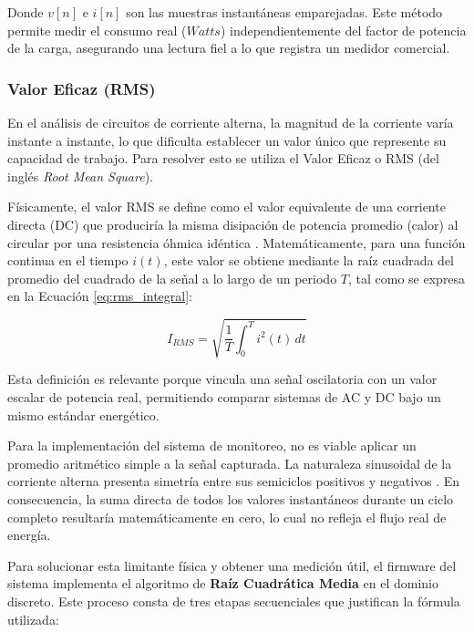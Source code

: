             Donde $v[n]$ e $i[n]$ son las muestras instantáneas emparejadas. Este método permite medir el consumo real ($Watts$) independientemente del factor de potencia de la carga, asegurando una lectura fiel a lo que registra un medidor comercial.

        \subsubsection{Valor Eficaz (RMS)}

            En el análisis de circuitos de corriente alterna, la magnitud de la corriente varía instante a instante, lo que dificulta establecer un valor único que represente su capacidad de trabajo. Para resolver esto se utiliza el Valor Eficaz o RMS (del inglés \textit{Root Mean Square}).

            Físicamente, el valor RMS se define como el valor equivalente de una corriente directa (DC) que produciría la misma disipación de potencia promedio (calor) al circular por una resistencia óhmica idéntica \cite{hayt2012}. Matemáticamente, para una función continua en el tiempo $i(t)$, este valor se obtiene mediante la raíz cuadrada del promedio del cuadrado de la señal a lo largo de un periodo $T$, tal como se expresa en la Ecuación \ref{eq:rms_integral}:

            \begin{equation}
                I_{RMS} = \sqrt{\frac{1}{T} \int_{0}^{T} i^2(t) \, dt}
                \label{eq:rms_integral}
            \end{equation}

            Esta definición es relevante porque vincula una señal oscilatoria con un valor escalar de potencia real, permitiendo comparar sistemas de AC y DC bajo un mismo estándar energético.

            Para la implementación del sistema de monitoreo, no es viable aplicar un promedio aritmético simple a la señal capturada. La naturaleza sinusoidal de la corriente alterna presenta simetría entre sus semiciclos positivos y negativos \cite{programarfacil}. En consecuencia, la suma directa de todos los valores instantáneos durante un ciclo completo resultaría matemáticamente en cero, lo cual no refleja el flujo real de energía.

            Para solucionar esta limitante física y obtener una medición útil, el firmware del sistema implementa el algoritmo de \textbf{Raíz Cuadrática Media} en el dominio discreto. Este proceso consta de tres etapas secuenciales que justifican la fórmula utilizada:

